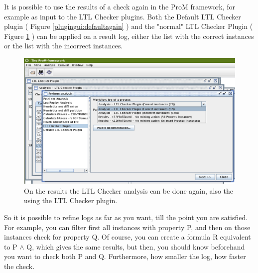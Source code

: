 It is possible to use the results of a check again in the ProM framework, for
example as input to the LTL Checker plugins. Both the Default LTL Checker
plugin ( Figure
\ref{plugingui:defaultagain} ) and the "normal"
LTL Checker Plugin ( Figure \ref{plugingui:genericagain} ) can be applied
on a result log, either the list with the correct instances or the list with
the incorrect instances.

\begin{figure}[H]
    \includegraphics[scale=0.4]{images/framework-log-and-results-and-ltl-analyse-cutted.eps}
    \caption{On the results the LTL Checker analysis can be done again, also
    the using the LTL Checker plugin.}
    \label{plugingui:genericagain}
\end{figure}

So it is possible to refine logs as far as you want, till the point you
are satisfied. For example, you can filter first all instances with property
P, and then on those instances check for property Q. Of course, you can create
a formula R equivalent to P $\wedge$ Q, which gives the same results, but then, you
should know beforehand you want to check both P and Q. Furthermore, how
smaller the log, how faster the check.

